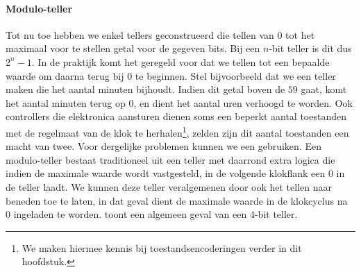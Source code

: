 \paragraph{Modulo-teller}
Tot nu toe hebben we enkel tellers geconstrueerd die tellen van $0$ tot het maximaal voor te stellen getal voor de gegeven bits. Bij een $n$-bit teller is dit dus $2^n-1$. In de praktijk komt het geregeld voor dat we tellen tot een bepaalde waarde om daarna terug bij $0$ te beginnen. Stel bijvoorbeeld dat we een teller maken die het aantal minuten bijhoudt. Indien dit getal boven de $59$ gaat, komt het aantal minuten terug op $0$, en dient het aantal uren verhoogd te worden. Ook controllers die elektronica aansturen dienen soms een beperkt aantal toestanden met de regelmaat van de klok te herhalen\footnote{We maken hiermee kennis bij toestandsencoderingen verder in dit hoofdstuk.}, zelden zijn dit aantal toestanden een macht van twee. Voor dergelijke problemen kunnen we een  gebruiken. Een modulo-teller bestaat traditioneel uit een teller met daarrond extra logica die indien de maximale waarde wordt vastgesteld, in de volgende klokflank een $0$ in de teller laadt. We kunnen deze teller veralgemenen door ook het tellen naar beneden toe te laten, in dat geval dient de maximale waarde in de klokcyclus na $0$ ingeladen te worden.  toont een algemeen geval van een $4$-bit teller.

